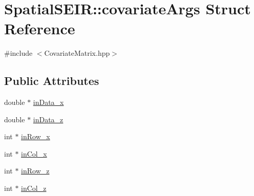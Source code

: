 \hypertarget{structSpatialSEIR_1_1covariateArgs}{\section{Spatial\-S\-E\-I\-R\-:\-:covariate\-Args Struct Reference}
\label{structSpatialSEIR_1_1covariateArgs}
}


{\ttfamily \#include $<$Covariate\-Matrix.\-hpp$>$}

\subsection*{Public Attributes}
\begin{DoxyCompactItemize}
\item 
double $\ast$ \hyperlink{structSpatialSEIR_1_1covariateArgs_a3e246842542e2b74da77f0f666d22dd1}{in\-Data\-\_\-x}
\item 
double $\ast$ \hyperlink{structSpatialSEIR_1_1covariateArgs_a43af9cbaf391c6143054ef57a809f6d8}{in\-Data\-\_\-z}
\item 
int $\ast$ \hyperlink{structSpatialSEIR_1_1covariateArgs_af1c371b03a94d277a43d9f5aecc117aa}{in\-Row\-\_\-x}
\item 
int $\ast$ \hyperlink{structSpatialSEIR_1_1covariateArgs_ab62fd8861e67e0911f1af78a0d77572e}{in\-Col\-\_\-x}
\item 
int $\ast$ \hyperlink{structSpatialSEIR_1_1covariateArgs_a669bcd8ad82576664761bb25bfaba53e}{in\-Row\-\_\-z}
\item 
int $\ast$ \hyperlink{structSpatialSEIR_1_1covariateArgs_a15b3c909a5218f2035bb03e4f21a5a95}{in\-Col\-\_\-z}
\end{DoxyCompactItemize}


